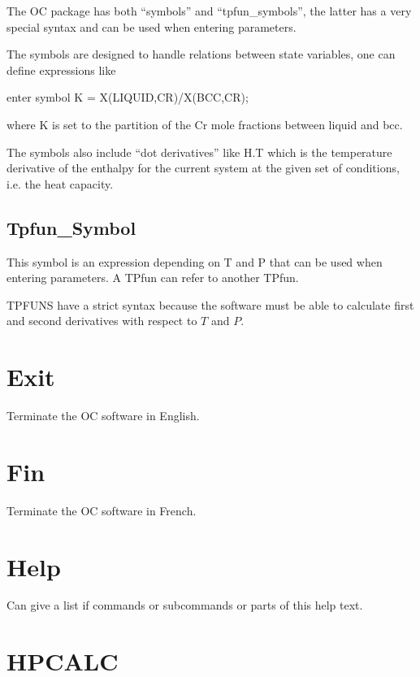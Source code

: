 \documentclass[12pt]{article}
\begin{document}
The OC package has both ``symbols'' and ``tpfun\_symbols'', the latter
has a very special syntax and can be used when entering parameters.

The symbols are designed to handle relations between state variables,
one can define expressions like 

enter symbol K = X(LIQUID,CR)/X(BCC,CR);

where K is set to the partition of the Cr mole fractions between
liquid and bcc.

The symbols also include ``dot derivatives'' like H.T which is the
temperature derivative of the enthalpy for the current system at the
given set of conditions, i.e. the heat capacity.

\subsection{Tpfun\_Symbol}

This symbol is an expression depending on T and P that can be used
when entering parameters.  A TPfun can refer to another TPfun.

TPFUNS have a strict syntax because the software must be able to
calculate first and second derivatives with respect to $T$ and $P$.

\section{Exit}

Terminate the OC software in English.

\section{Fin }

Terminate the OC software in French.

\section{Help }

Can give a list if commands or subcommands or parts of this help text.

\section{HPCALC }
\end{document}
